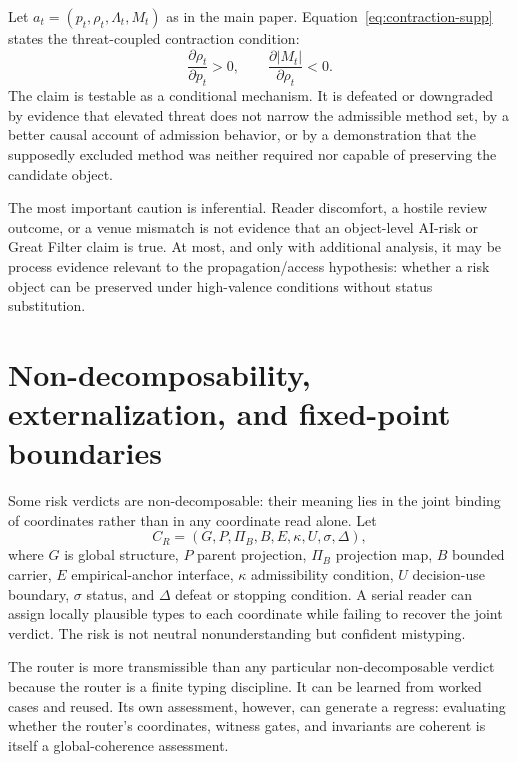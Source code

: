\documentclass[10pt]{article}
\begin{document}
Let $a_t=(p_t,\rho_t,\Lambda_t,M_t)$ as in the main paper. Equation~\eqref{eq:contraction-supp} states the threat-coupled contraction condition:
\begin{equation}
\frac{\partial \rho_t}{\partial p_t}>0,\qquad \frac{\partial |M_t|}{\partial \rho_t}<0.
\label{eq:contraction-supp}
\end{equation}
The claim is testable as a conditional mechanism. It is defeated or downgraded by evidence that elevated threat does not narrow the admissible method set, by a better causal account of admission behavior, or by a demonstration that the supposedly excluded method was neither required nor capable of preserving the candidate object.

The most important caution is inferential. Reader discomfort, a hostile review outcome, or a venue mismatch is not evidence that an object-level AI-risk or Great Filter claim is true. At most, and only with additional analysis, it may be process evidence relevant to the propagation/access hypothesis: whether a risk object can be preserved under high-valence conditions without status substitution.

\section{Non-decomposability, externalization, and fixed-point boundaries}
\label{sec:nondecomp}

Some risk verdicts are non-decomposable: their meaning lies in the joint binding of coordinates rather than in any coordinate read alone. Let
\begin{equation}
C_R=(G,P,\Pi_B,B,E,\kappa,U,\sigma,\Delta),
\end{equation}
where $G$ is global structure, $P$ parent projection, $\Pi_B$ projection map, $B$ bounded carrier, $E$ empirical-anchor interface, $\kappa$ admissibility condition, $U$ decision-use boundary, $\sigma$ status, and $\Delta$ defeat or stopping condition. A serial reader can assign locally plausible types to each coordinate while failing to recover the joint verdict. The risk is not neutral nonunderstanding but confident mistyping.

The router is more transmissible than any particular non-decomposable verdict because the router is a finite typing discipline. It can be learned from worked cases and reused. Its own assessment, however, can generate a regress: evaluating whether the router's coordinates, witness gates, and invariants are coherent is itself a global-coherence assessment.
\end{document}
